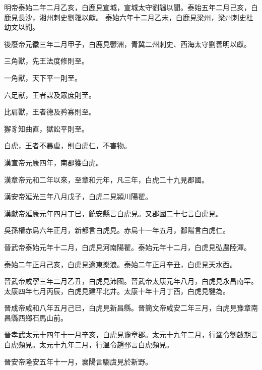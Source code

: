 \begin{pinyinscope}
 明帝泰始二年二月乙亥，白鹿見宣城，宣城太守劉韞以聞。泰始五年二月己亥，白鹿見長沙，湘州刺史劉韞以獻。
 泰始六年十二月乙未，白鹿見梁州，梁州刺史杜幼文以聞。



 後廢帝元徽三年二月甲子，白鹿見鬱洲，青冀二州刺史、西海太守劉善明以獻。


三角獸，先王法度修則至。


一角獸，天下平一則至。


六足獸，王者謀及眾庶則至。


比肩獸，王者德及矜寡則至。


獬豸知曲直，獄訟平則至。



 白虎，王者不暴虐，則白虎仁，不害物。



 漢宣帝元康四年，南郡獲白虎。



 漢章帝元和二年以來，至章和元年，凡三年，白虎二十九見郡國。



 漢安帝延光三年八月戊子，白虎二見潁川陽翟。



 漢獻帝延康元年四月丁巳，饒安縣言白虎見。又郡國二十七言白虎見。



 吳孫權赤烏六年正月，新都言白虎見。赤烏十一年五月，鄱陽言白虎仁。



 晉武帝泰始元年十二月，白虎見河南陽翟。泰始元年十二月，白虎見弘農陸渾。



 泰始二年正月己亥，白虎見遼東樂浪。泰始二年正月辛丑，白虎見天水西。



 晉武帝咸寧三年二月乙丑，白虎見沛國。晉武帝太康元年八月，白虎見永昌南罕。
 太康四年七月丙辰，白虎見建平北井。太康十年十月丁酉，白虎見犍為。



 晉成帝咸和八年五月己已，白虎見新昌縣。晉簡文帝咸安二年三月，白虎見豫章南昌縣西鄉石馬山前。



 晉孝武太元十四年十一月辛亥，白虎見豫章郡。太元十九年二月，行鞏令劉啟期言白虎頻見。太元十九年二月，行溫令趙邳言白虎頻見。



 晉安帝隆安五年十一月，襄陽言騶虞見於新野。




\end{pinyinscope}
